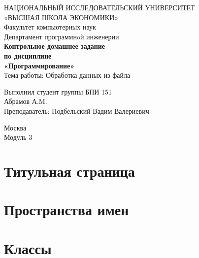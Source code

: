 \documentclass[twoside]{article}
\newcommand{\+}{\discretionary{\mbox{\scriptsize$\hookleftarrow$}}{}{}}
\newcommand{\clearemptydoublepage}{%
  \newpage{\pagestyle{empty}\cleardoublepage}%
}
\begin{document}
\begin{titlepage}
\begin{center}
\vspace*{1cm}
{\large НАЦИОНАЛЬНЫЙ ИССЛЕДОВАТЕЛЬСКИЙ УНИВЕРСИТЕТ \\
«ВЫСШАЯ ШКОЛА ЭКОНОМИКИ» }\\
\vspace*{0.5cm}
{\large Факультет компьютерных наук }\\
\vspace*{0.5cm}
{\small Департамент программнoй инженерии \\
}
\vfill %
{\large\textbf{
Контрольное домашнее задание \\
по дисциплине\\
«Программирование» \\
}}
\bigskip
{\large Тема работы: Обработка данных из файла }\\
\vfill
\begin{flushright}
Выполнил студент группы БПИ 151 \\
Абрамов А.M. \\
Преподаватель: Подбельский Вадим Валериевич \\
\end{flushright}
\vfill
Москва \number\year \\
Модуль 3
\end{center}
\end{titlepage}

\tableofcontents
{}



\section{Титульная страница}
\label{index}
\section{Пространства имен}

\section{Классы}










\newpage
{}
\clearemptydoublepage
{}
\printindex
\end{document}
